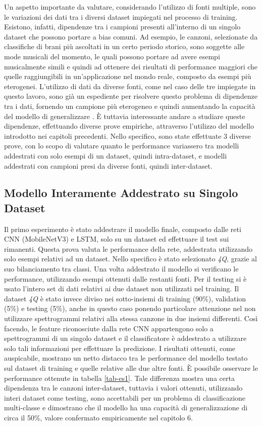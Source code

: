 \documentclass[11pt]{report}
\begin{document}
Un aspetto importante da valutare, considerando l'utilizzo di fonti multiple, sono le variazioni dei dati tra i diversi dataset impiegati nel processo di training. Esistono, infatti, dipendenze tra i campioni presenti all'interno di un singolo dataset che possono portare a bias comuni. Ad esempio, le canzoni, selezionate da classifiche di brani più ascoltati in un certo periodo storico, sono soggette alle mode musicali del momento, le quali possono portare ad avere esempi musicalmente simili e quindi ad ottenere dei risultati di performance maggiori che quelle raggiungibili in un'applicazione nel mondo reale, composto da esempi più eterogenei. L'utilizzo di dati da diverse fonti, come nel caso delle tre impiegate in questo lavoro, sono già un espediente per risolvere questo problema di dipendenze tra i dati, fornendo un campione più eterogeneo e quindi aumentando la capacità del modello di generalizzare \cite{intra-inter}. È tuttavia interessante andare a studiare queste dipendenze, effettuando diverse prove empiriche, attraverso l'utilizzo del modello introdotto nei capitoli precedenti. Nello specifico, sono state effettuate 3 diverse prove, con lo scopo di valutare quanto le performance variassero tra modelli addestrati con solo esempi di un dataset, quindi intra-dataset, e modelli addestrati con campioni presi da diverse fonti, quindi inter-dataset.

\subsection{Modello Interamente Addestrato su Singolo Dataset}

Il primo esperimento è stato addestrare il modello finale, composto dalle reti CNN (MobileNetV3) e LSTM, solo su un dataset ed effettuare il test sui rimanenti. Questa prova valuta le performance della rete, addestrata utilizzando solo esempi relativi ad un dataset. Nello specifico è stato selezionato \textit{4Q}, grazie al suo bilanciamento tra classi. Una volta addestrato il modello si verificano le performance, utilizzando esempi ottenuti dalle restanti fonti. Per il testing si è usato l'intero set di dati relativi ai due dataset non utilizzati nel training. Il dataset \textit{4Q} è stato invece diviso nei sotto-insiemi di training (90\%), validation (5\%) e testing (5\%), anche in questo caso ponendo particolare attenzione nel non utilizzare spettrogrammi relativi alla stessa canzone in due insiemi differenti. Così facendo, le feature riconosciute dalla rete CNN appartengono solo a spettrogrammi di un singolo dataset e il classificatore è addestrato a utilizzare solo tali informazioni per effettuare la predizione. I risultati ottenuti, come auspicabile, mostrano un netto distacco tra le performance del modello testato sul dataset di training e quelle relative alle due altre fonti. È possibile osservare le performance ottenute in tabella \ref{tab-es1}. Tale differenza mostra una certa dipendenza tra le canzoni  inter-dataset, tuttavia i valori ottenuti, utilizzando interi dataset come testing, sono accettabili per un problema di classificazione multi-classe e dimostrano che il modello ha una capacità di generalizzazione di circa il 50\%, valore confermato empiricamente nel capitolo 6.
\end{document}
